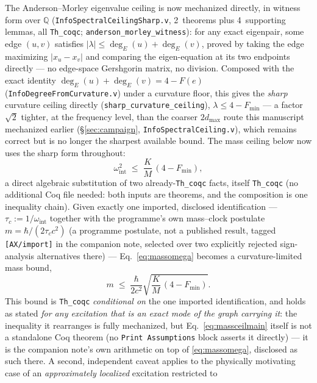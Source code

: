 \documentclass[10pt,twocolumn]{article}
\begin{document}
The Anderson--Morley eigenvalue ceiling \cite{andersonmorley1985} is now
mechanized directly, in witness form over $\mathbb{Q}$
(\texttt{InfoSpectralCeilingSharp.v}, 2~theorems plus 4~supporting lemmas,
all \texttt{Th\_coqc}; \texttt{anderson\_morley\_witness}):
for any exact eigenpair, some edge $(u,v)$ satisfies
$\lvert\lambda\rvert\le\deg_E(u)+\deg_E(v)$, proved by taking the edge
maximizing $\lvert x_u-x_v\rvert$ and comparing the eigen-equation at its two
endpoints directly --- no edge-space Gershgorin matrix, no division. Composed
with the exact identity $\deg_E(u)+\deg_E(v)=4-F(e)$
(\texttt{InfoDegreeFromCurvature.v}) under a curvature floor, this gives the
\emph{sharp} curvature ceiling directly
(\texttt{sharp\_curvature\_ceiling}), $\lambda\le4-F_{\min}$ --- a factor
$\sqrt2$ tighter, at the frequency level, than the coarser $2d_{\max}$ route
this manuscript mechanized earlier (\S\ref{sec:campaign},
\texttt{InfoSpectralCeiling.v}), which remains correct but is no longer the
sharpest available bound. The mass ceiling below now uses the sharp form
throughout:
\begin{equation}
\omega_{\mathrm{int}}^2 \;\le\; \frac{K}{M}\,(4-F_{\min}),
\label{eq:massomega}
\end{equation}
a direct algebraic substitution of two already-\texttt{Th\_coqc} facts, itself
\texttt{Th\_coqc} (no additional Coq file needed: both inputs are theorems,
and the composition is one inequality chain). Given exactly one imported,
disclosed identification --- $\tau_c:=1/\omega_{\mathrm{int}}$ together with
the programme's own mass--clock postulate $m=\hbar/(2\tau_c c^2)$ (a
programme postulate, not a published result, tagged \texttt{[AX/import]} in
the companion note, selected over two explicitly rejected sign-analysis
alternatives there) --- Eq.~\ref{eq:massomega} becomes a curvature-limited
mass bound,
\begin{equation}
m \;\le\; \frac{\hbar}{2c^2}\sqrt{\frac{K}{M}\,(4-F_{\min})}.
\label{eq:massceilmain}
\end{equation}
This bound is \texttt{Th\_coqc} \emph{conditional on} the one imported
identification, and holds as stated \emph{for any excitation that is an exact
mode of the graph carrying it}: the inequality it rearranges is fully
mechanized, but Eq.~\ref{eq:massceilmain} itself is not a standalone Coq
theorem (no \texttt{Print Assumptions} block asserts it directly) --- it is
the companion note's own arithmetic on top of \eqref{eq:massomega}, disclosed
as such there. A second, independent caveat applies to the physically
motivating case of an \emph{approximately localized} excitation restricted to
\end{document}
